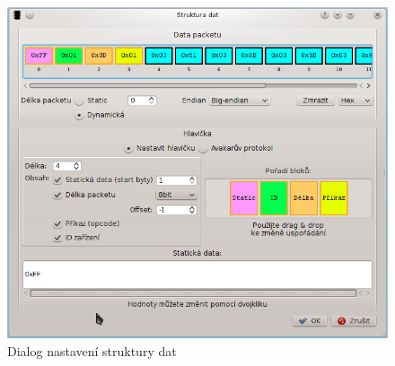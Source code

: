 \documentclass[12pt, a4paper, oneside]{article}
\begin{document}
\begin{figure}[H]
\begin{center}
\includegraphics[scale=0.65]{img/analyzer_struct.png}
\caption{Dialog nastavení struktury dat}
\label{Analyzer_struct}
\end{center}
\end{figure}
\end{document}
